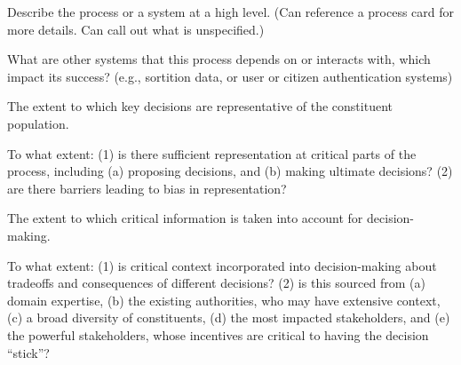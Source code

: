 


    \begin{describe}[black]
        Describe the process or a system at a high level. (Can reference a process card for more details. Can call out what is unspecified.)
    \end{describe}
    \dscplaceholder

    \begin{describe}[black]
        What are other systems that this process depends on or interacts with, which impact its success? (e.g., sortition data, or user or citizen authentication systems)
    \end{describe}
    \dscplaceholder
    

    \begin{describe}[black]
        The extent to which key decisions are representative of the constituent population.
    \end{describe}
    \dscplaceholder

    \begin{evaluate}[black]
        To what extent: (1) is there sufficient representation at critical parts of the process, including (a) proposing decisions, and (b) making ultimate decisions? (2) are there barriers leading to bias in representation?
    \end{evaluate}
    \dscplaceholder
    

    \begin{describe}[black]
        The extent to which critical information is taken into account for decision-making.
    \end{describe}
    \dscplaceholder
    
    \begin{evaluate}[black]
        To what extent: (1) is critical context incorporated into decision-making about tradeoffs and consequences of different decisions? (2) is this sourced from (a) domain expertise, (b) the existing authorities, who may have extensive context, (c) a broad diversity of constituents, (d) the most impacted stakeholders, and (e) the powerful stakeholders, whose incentives are critical to having the decision ``stick''?
    \end{evaluate}
    \dscplaceholder
    
    
